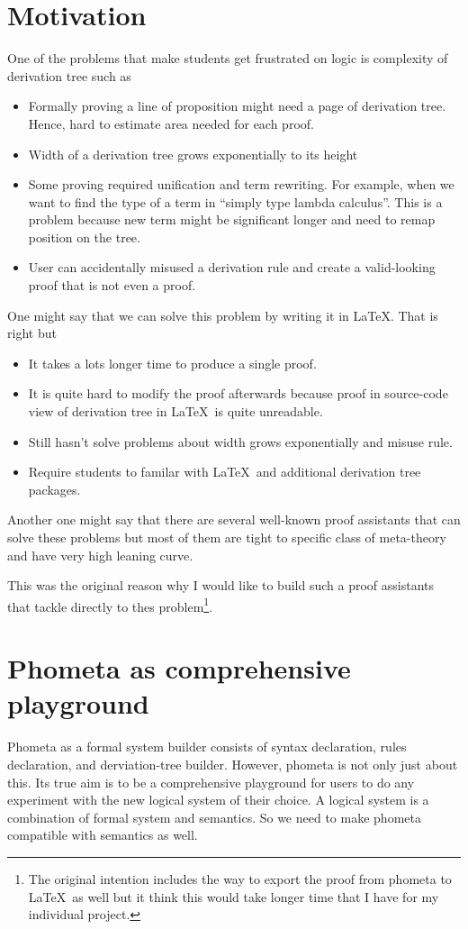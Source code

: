 \documentclass[master.tex]{subfiles}
\begin{document}
\section{Motivation}
One of the problems that make students get frustrated on logic is complexity of derivation tree such as

\begin{itemize}
    \item Formally proving a line of proposition might need a page of derivation tree. Hence, hard to estimate area needed for each proof.
    \item Width of a derivation tree grows exponentially to its height
    \item Some proving required unification and term rewriting. For example, when we want to find the type of a term in ``simply type lambda calculus''. This is a problem because new term might be significant longer and need to remap position on the tree.
    \item User can accidentally misused a derivation rule and create a valid-looking proof that is not even a proof.
\end{itemize}

One might say that we can solve this problem by writing it in \LaTeX. That is right but
\begin{itemize}
    \item It takes a lots longer time to produce a single proof.
    \item It is quite hard to modify the proof afterwards because proof in source-code view of derivation tree in \LaTeX\ is quite unreadable.
    \item Still hasn't solve problems about width grows exponentially and misuse rule.
    \item Require students to familar with \LaTeX\ and additional derivation tree packages.
\end{itemize}

Another one might say that there are several well-known proof assistants that can solve these problems but most of them are tight to specific class of meta-theory and have very high leaning curve.

This was the original reason why I would like to build such a proof assistants that tackle directly to thes problem\footnote{The original intention includes the way to export the proof from phometa to \LaTeX\ as well but it think this would take longer time that I have for my individual project.}.

\section{Phometa as comprehensive playground}
Phometa as a formal system builder consists of syntax declaration, rules declaration, and derviation-tree builder. However, phometa is not only just about this. Its true aim is to be a comprehensive playground for users to do any experiment with the new logical system of their choice. A logical system is a combination of formal system and semantics. So we need to make phometa compatible with semantics as well.
\end{document}
